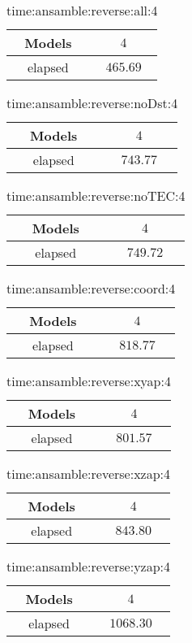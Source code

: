 \begin{table}[!ht]
	\centering
	\begin{tabular}{|c|c|}
		\hline
		Models & $4$ \\ \hline
		elapsed & $465.69$ \\ \hline
	\end{tabular}
	\caption{time:ansamble:reverse:all:4}
	\label{tab:time:ansamble:reverse:all:4}
\end{table}

\begin{table}[!ht]
	\centering
	\begin{tabular}{|c|c|}
		\hline
		Models & $4$ \\ \hline
		elapsed & $743.77$ \\ \hline
	\end{tabular}
	\caption{time:ansamble:reverse:noDst:4}
	\label{tab:time:ansamble:reverse:noDst:4}
\end{table}

\begin{table}[!ht]
	\centering
	\begin{tabular}{|c|c|}
		\hline
		Models & $4$ \\ \hline
		elapsed & $749.72$ \\ \hline
	\end{tabular}
	\caption{time:ansamble:reverse:noTEC:4}
	\label{tab:time:ansamble:reverse:noTEC:4}
\end{table}

\begin{table}[!ht]
	\centering
	\begin{tabular}{|c|c|}
		\hline
		Models & $4$ \\ \hline
		elapsed & $818.77$ \\ \hline
	\end{tabular}
	\caption{time:ansamble:reverse:coord:4}
	\label{tab:time:ansamble:reverse:coord:4}
\end{table}

\begin{table}[!ht]
	\centering
	\begin{tabular}{|c|c|}
		\hline
		Models & $4$ \\ \hline
		elapsed & $801.57$ \\ \hline
	\end{tabular}
	\caption{time:ansamble:reverse:xyap:4}
	\label{tab:time:ansamble:reverse:xyap:4}
\end{table}

\begin{table}[!ht]
	\centering
	\begin{tabular}{|c|c|}
		\hline
		Models & $4$ \\ \hline
		elapsed & $843.80$ \\ \hline
	\end{tabular}
	\caption{time:ansamble:reverse:xzap:4}
	\label{tab:time:ansamble:reverse:xzap:4}
\end{table}

\begin{table}[!ht]
	\centering
	\begin{tabular}{|c|c|}
		\hline
		Models & $4$ \\ \hline
		elapsed & $1068.30$ \\ \hline
	\end{tabular}
	\caption{time:ansamble:reverse:yzap:4}
	\label{tab:time:ansamble:reverse:yzap:4}
\end{table}
